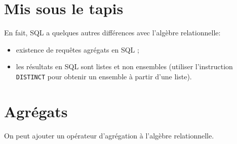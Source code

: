 %
%
%
%
%
\section{Mis sous le tapis}
En fait, SQL a quelques autres différences avec l'algèbre
relationnelle:

\begin{itemize}
\item existence de requêtes agrégats en SQL ;
\item les résultats en SQL sont listes et non ensembles (utiliser l'instruction \texttt{DISTINCT} pour obtenir un ensemble à partir d'une liste).
\end{itemize}

\section{Agrégats}

On peut ajouter un opérateur d'agrégation à l'algèbre relationnelle.


